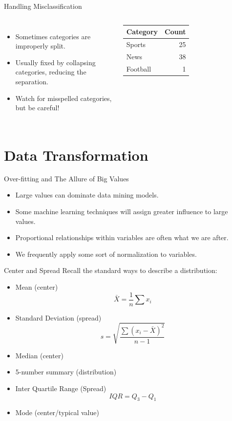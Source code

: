 \documentclass[handout]{beamer}
\begin{document}
\begin{frame}{Handling Misclassification}
\begin{columns}
  \begin{itemize}[<+->]
  \item Sometimes categories are improperly split.
  \item Usually fixed by collapsing categories, reducing the separation.
  \item Watch for misspelled categories, but be careful!
  \end{itemize}
  
  \begin{tabular}{l|r}
  {\bf Category} & {\bf Count} \\
  \hline
  Sports & 25 \\
  News & 38 \\
  Football & 1\\
  \end{tabular}
\end{columns}
\end{frame}


\section{Data Transformation}
\begin{frame}{Over-fitting and The Allure of Big Values}
\begin{itemize}[<+->]
  \item Large values can dominate data mining models.
  \item Some machine learning techniques will assign greater influence to large values.
  \item Proportional relationships within variables are often what we are after.
  \item We frequently apply some sort of normalization to variables.
\end{itemize}
\end{frame}

\begin{frame}{Center and Spread}
Recall the standard ways to describe a distribution: 
\begin{itemize}[<+->]
  \item Mean (center)
  \[
  \bar{X}=\displaystyle\frac{1}{n}\sum x_i
  \]
  \item Standard Deviation (spread)
  \[
  s = \sqrt{\displaystyle\frac{\sum (x_i-\bar{X})^2}{n-1}}
  \]
  \item Median (center)
  \item 5-number summary (distribution)
  \item Inter Quartile Range (Spread)
  \[
  IQR = Q_3 - Q_1
  \]
  \item Mode (center/typical value)
\end{itemize}
\end{frame}
\end{document}
